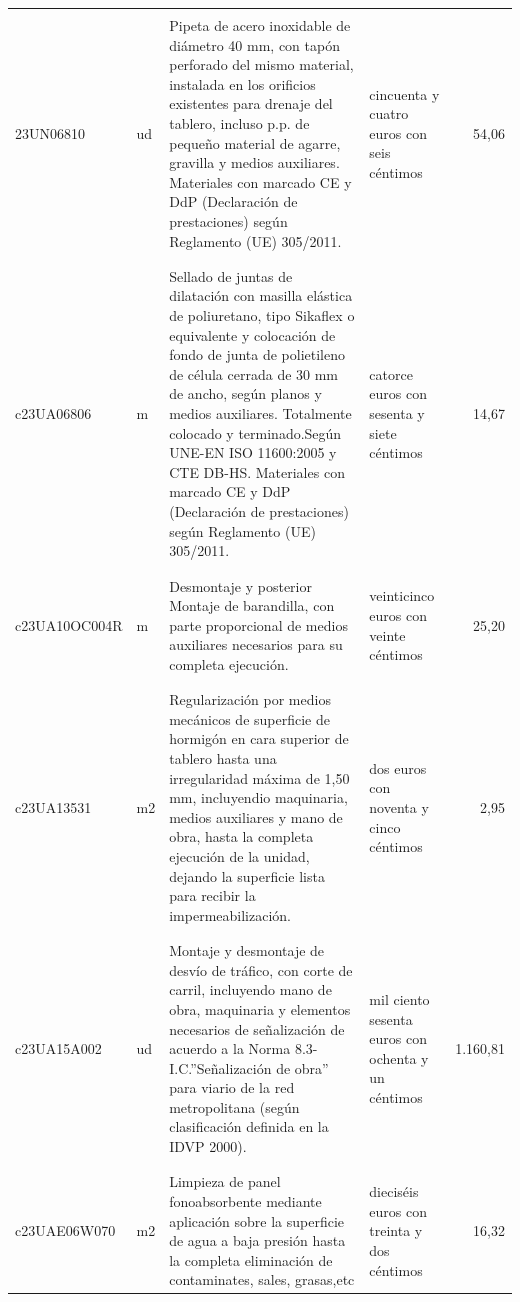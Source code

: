 \documentclass{book}%
\begin{document}
\begin{longtable}{|l|l|p{5cm}|p{3cm}|r|}
&&&&\\%
23UN06810&ud&Pipeta de acero inoxidable de diámetro 40 mm, con tapón perforado del mismo material, instalada en los orificios existentes para drenaje del tablero, incluso p.p. de pequeño material de agarre, gravilla y medios auxiliares. Materiales con marcado CE y DdP (Declaración de prestaciones) según Reglamento (UE) 305/2011.&cincuenta y cuatro euros con seis céntimos&54,06\\%
&&&&\\%
&&&&\\%
c23UA06806&m&Sellado de juntas de dilatación con masilla elástica de poliuretano, tipo Sikaflex o equivalente y colocación de fondo de junta de polietileno de célula cerrada de 30 mm de ancho, según planos y medios auxiliares. Totalmente colocado y terminado.Según UNE{-}EN ISO 11600:2005 y CTE DB{-}HS. Materiales con marcado CE y DdP (Declaración de prestaciones) según Reglamento (UE) 305/2011.&catorce euros con sesenta y siete céntimos&14,67\\%
&&&&\\%
&&&&\\%
c23UA10OC004R&m&Desmontaje y posterior Montaje de barandilla, con parte proporcional de medios auxiliares necesarios para su completa ejecución.&veinticinco euros con veinte céntimos&25,20\\%
&&&&\\%
&&&&\\%
c23UA13531&m2&Regularización por medios mecánicos de superficie de hormigón en cara superior de tablero hasta una irregularidad máxima de 1,50 mm, incluyendio maquinaria, medios auxiliares y mano de obra, hasta la completa ejecución de la unidad, dejando la superficie lista para recibir la impermeabilización.&dos euros con noventa y cinco céntimos&2,95\\%
&&&&\\%
&&&&\\%
c23UA15A002&ud&Montaje y desmontaje de desvío de tráfico, con corte de carril, incluyendo mano de obra, maquinaria y elementos necesarios de señalización de acuerdo a la Norma 8.3{-}I.C.”Señalización de obra” para viario de la red metropolitana (según clasificación definida en la IDVP 2000).&mil ciento sesenta euros con ochenta y un céntimos&1.160,81\\%
&&&&\\%
&&&&\\%
c23UAE06W070&m2&Limpieza de panel fonoabsorbente mediante aplicación sobre la superficie de agua a baja presión hasta la completa eliminación de contaminates, sales, grasas,etc &dieciséis euros con treinta y dos céntimos&16,32\\%

\end{longtable}
\end{document}
